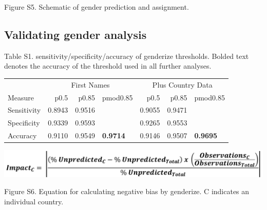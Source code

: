\documentclass[11pt,]{article}
\begin{document}
Figure S5. Schematic of gender prediction and assignment.

\newpage

\subsection{Validating gender
analysis}\label{validating-gender-analysis}

Table S1. sensitivity/specificity/accuracy of genderize thresholds.
Bolded text denotes the accuracy of the threshold used in all further
analyses.

\begin{table}[H]
\centering
\begin{tabular}{l|r|r|l|r|r|l}
\hline
\multicolumn{1}{c|}{ } & \multicolumn{3}{c|}{First Names} & \multicolumn{3}{c}{Plus Country Data} \\
\cline{2-4} \cline{5-7}
Measure & p0.5 & p0.85 & pmod0.85 & p0.5 & p0.85 & pmod0.85\\
\hline
Sensitivity & 0.8943 & 0.9516 & \cellcolor{white}{0.971} & 0.9055 & 0.9471 & \cellcolor{white}{0.9669}\\
\hline
Specificity & 0.9339 & 0.9593 & \cellcolor{white}{0.972} & 0.9265 & 0.9553 & \cellcolor{white}{0.9727}\\
\hline
Accuracy & 0.9110 & 0.9549 & \textbf{0.9714} & 0.9146 & 0.9507 & \textbf{0.9695}\\
\hline
\end{tabular}
\end{table}

\vspace{40mm}

\includegraphics{impact_equation.png}

Figure S6. Equation for calculating negative bias by genderize. C
indicates an individual country.

\newpage
\end{document}
